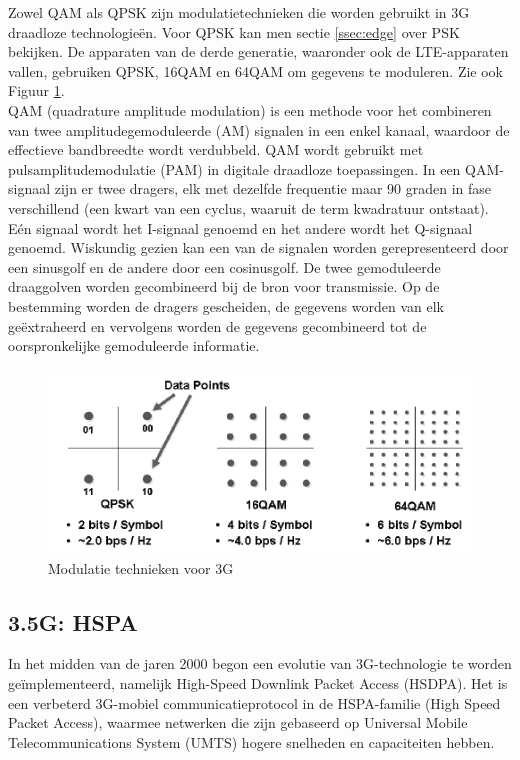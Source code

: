 \documentclass{article}
\begin{document}
\noindent Zowel QAM als QPSK zijn modulatietechnieken die worden gebruikt in 3G draadloze technologieën. Voor QPSK kan men sectie \ref{ssec:edge} over PSK bekijken. De apparaten van de derde generatie, waaronder ook de LTE-apparaten vallen, gebruiken QPSK, 16QAM en 64QAM om gegevens te moduleren. Zie ook Figuur \ref{fig:qam}.\\

\noindent QAM (quadrature amplitude modulation) is een methode voor het combineren van twee amplitudegemoduleerde (AM) signalen in een enkel kanaal, waardoor de effectieve bandbreedte wordt verdubbeld. QAM wordt gebruikt met pulsamplitudemodulatie (PAM) in digitale draadloze toepassingen. In een QAM-signaal zijn er twee dragers, elk met dezelfde frequentie maar 90 graden in fase verschillend (een kwart van een cyclus, waaruit de term kwadratuur ontstaat). Eén signaal wordt het I-signaal genoemd en het andere wordt het Q-signaal genoemd. Wiskundig gezien kan een van de signalen worden gerepresenteerd door een sinusgolf en de andere door een cosinusgolf. De twee gemoduleerde draaggolven worden gecombineerd bij de bron voor transmissie. Op de bestemming worden de dragers gescheiden, de gegevens worden van elk geëxtraheerd en vervolgens worden de gegevens gecombineerd tot de oorspronkelijke gemoduleerde informatie. \cite{3gmod} \cite{qam}

\begin{figure}[H]
\centering
\includegraphics[width=0.85 \textwidth]{img/qam.png}
\caption{Modulatie technieken voor 3G}
\label{fig:qam}
\end{figure}

\subsection{3.5G: HSPA}
In het midden van de jaren 2000 begon een evolutie van 3G-technologie te worden geïmplementeerd, namelijk High-Speed Downlink Packet Access (HSDPA). Het is een verbeterd 3G-mobiel communicatieprotocol in de HSPA-familie (High Speed Packet Access), waarmee netwerken die zijn gebaseerd op Universal Mobile Telecommunications System (UMTS) hogere snelheden en capaciteiten hebben. \cite{3g}
\end{document}
